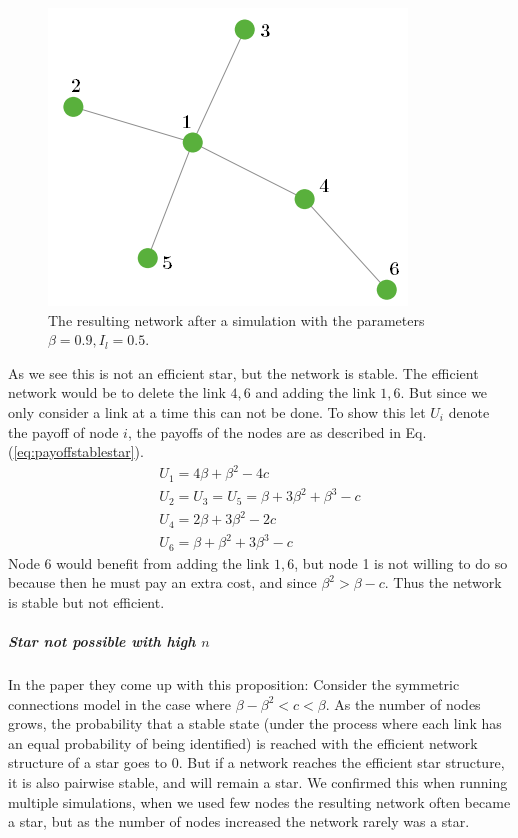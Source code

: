 \begin{figure}[h]
\centering
  \includegraphics[width=0.5\linewidth]{../Figures/stability/Unefficientbutstablestar.png}
  \caption{\label{fig:stablestar} The resulting network after a simulation with the parameters $\beta=0.9, I_{l}=0.5$.}
\end{figure}
As we see this is not an efficient star, but the network is stable. The efficient network would be to delete the link $4,6$ and adding the link $1,6$. But since we only consider a link at a time this can not be done. To show this let $U_{i}$ denote the payoff of node $i$, the payoffs of the nodes are as described in Eq.(\ref{eq:payoffstablestar}).
\begin{eqnarray}
U_{1}=4\beta+\beta^2-4c\\
U_{2}=U_{3}=U_{5}=\beta+3\beta^2+\beta^3-c\\
U_{4}=2\beta+3\beta^2-2c\\
U_{6}=\beta+\beta^2+3\beta^3-c
\label{eq:payoffstablestar}
\end{eqnarray}
Node $6$ would benefit from adding the link $1,6$, but node 1 is not willing to do so because then he must pay an extra cost, and since $\beta^2>\beta-c$. Thus the network is stable but not efficient. 

\subparagraph{Star not possible with high $n$}
In the paper \cite{jackson2005survey} they come up with this proposition:
Consider the symmetric connections model in the case where $\beta-\beta^2<c<\beta$. As the number of nodes grows, the probability that a stable state (under the process where each link has an equal probability of being identified) is reached with the efficient network structure of a star goes to 0. But if a network reaches the efficient star structure, it is also pairwise stable, and will remain a star. 
We confirmed this when running multiple simulations, when we used few nodes the resulting network often became a star, but as the number of nodes increased the network rarely was a star. 

